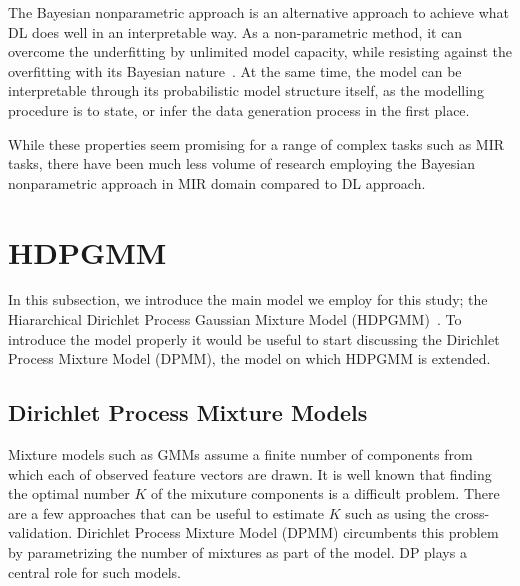 \documentclass{article}
\begin{document}
The Bayesian nonparametric approach is an alternative approach to achieve what DL does well in an interpretable way. As a non-parametric method, it can overcome the underfitting by unlimited model capacity, while resisting against the overfitting with its Bayesian nature~\cite{DBLP:reference/ml/Teh17}. At the same time, the model can be interpretable through its probabilistic model structure itself, as the modelling procedure is to state, or infer the data generation process in the first place.


While these properties seem promising for a range of complex tasks such as MIR tasks, there have been much less volume of research employing the Bayesian nonparametric approach in MIR domain compared to DL approach.


%

% 

\section{HDPGMM}\label{sec:hdpgmm}

In this subsection, we introduce the main model we employ for this study; the Hiararchical Dirichlet Process Gaussian Mixture Model (HDPGMM)~\cite{DBLP:conf/ismir/HoffmanBC08, doi:10.1198/016214506000000302}. To introduce the model properly it would be useful to start discussing the Dirichlet Process Mixture Model (DPMM), the model on which HDPGMM is extended.

\subsection{Dirichlet Process Mixture Models}\label{sec:hdpgmm:dpmm}

Mixture models such as GMMs assume a finite number of components from which each of observed feature vectors are drawn. It is well known that finding the optimal number $K$ of the mixuture components is a difficult problem. There are a few approaches that can be useful to estimate $K$ such as using the cross-validation. Dirichlet Process Mixture Model (DPMM) circumbents this problem by parametrizing the number of mixtures as part of the model. DP plays a central role for such models.
\end{document}
